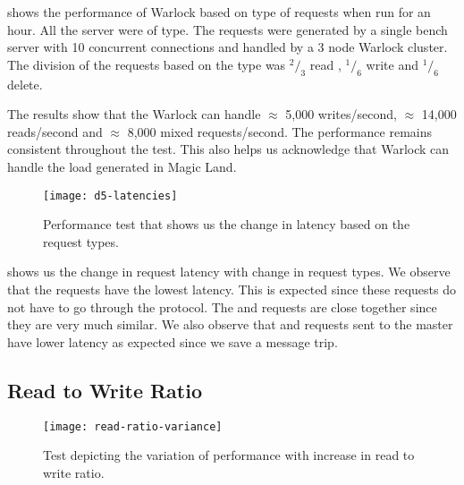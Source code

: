  shows the performance of Warlock based on
type of requests when run for an hour. All the server were of 
type. The requests were generated by a single bench server with 10 concurrent
connections and handled by a 3 node Warlock cluster. The division of the
requests based on the type was ${}^2/_3$ read , ${}^1/_6$ write and ${}^1/_6$
delete.


The results show that the Warlock can handle $\approx$ 5,000 writes/second, 
$\approx$ 14,000 reads/second and $\approx$ 8,000 mixed requests/second. The
performance remains consistent throughout the test. This also helps us
acknowledge that Warlock can handle the load generated in Magic Land.

\begin{figure}
  \begin{whole}
    \texttt{[image: d5-latencies]}
    \caption[General Performance Latency Test]{%
      Performance test that shows us the change in latency based on the request
      types.
    }
    \label{figure:res.general.latency}
  \end{whole}
\end{figure}

 shows us the change in request latency%
 with change in request types. We observe that the  requests have the
lowest latency. This is expected since these requests do not have to go through
the protocol. The  and  requests are close together since
they are very much similar. We also observe that  and  
requests sent to the master have lower latency as expected since we save a
message trip.

\subsection{Read to Write Ratio}

\begin{figure}
  \begin{whole}
    \texttt{[image: read-ratio-variance]}
    \caption[Read to Write Ratio Test]{%
      Test depicting the variation of performance with increase in read
      to write ratio.
    }
    \label{figure:res.read.write.ratio}
  \end{whole}
\end{figure}

